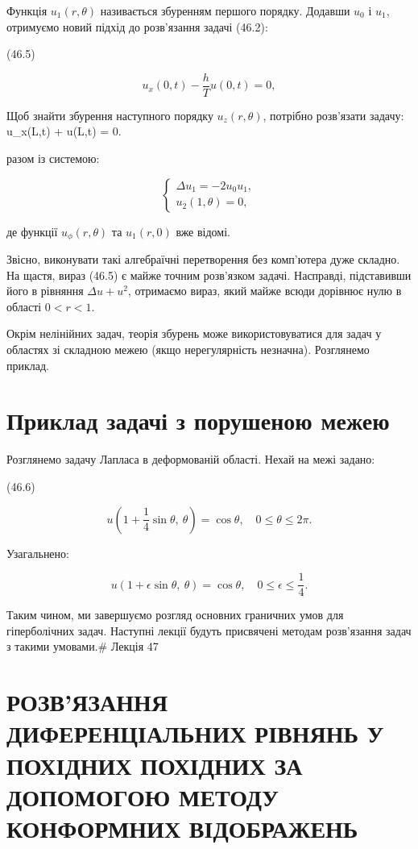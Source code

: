 \documentclass[
  ukrainian,
]{article}
\begin{document}
Функція \(u_1(r,\theta)\) називається збуренням першого порядку. Додавши
\(u_0\) і \(u_1\), отримуємо новий підхід до розв'язання задачі (46.2):

(46.5)

\[
u_x(0,t) - \frac{h}{T}u(0,t) = 0,
\]

Щоб знайти збурення наступного порядку \(u_z(r,\theta)\), потрібно
розв'язати задачу: u\_x(L,t) + u(L,t) = 0.

разом із системою:

\[
\begin{cases}
\Delta u_{1} = -2u_{0}u_{1}, \\
u_{2}(1,\theta) = 0,
\end{cases}
\]

де функції \(u_{\phi}(r,\theta)\) та \(u_{1}(r,0)\) вже відомі.

Звісно, виконувати такі алгебраїчні перетворення без комп'ютера дуже
складно. На щастя, вираз (46.5) є майже точним розв'язком задачі.
Насправді, підставивши його в рівняння \(\Delta u + u^{2}\), отримаємо
вираз, який майже всюди дорівнює нулю в області \(0 < r < 1\).

Окрім нелінійних задач, теорія збурень може використовуватися для задач
у областях зі складною межею (якщо нерегулярність незначна). Розглянемо
приклад.

\section{Приклад задачі з порушеною
межею}\label{ux43fux440ux438ux43aux43bux430ux434-ux437ux430ux434ux430ux447ux456-ux437-ux43fux43eux440ux443ux448ux435ux43dux43eux44e-ux43cux435ux436ux435ux44e}

Розглянемо задачу Лапласа в деформованій області. Нехай на межі задано:

(46.6)

\[
u\left(1 + \frac{1}{4} \sin \theta,\ \theta\right) = \cos \theta,\quad 0 \le \theta \le 2\pi.
\]

Узагальнено:

\[
u(1+\epsilon\sin\theta,\ \theta) = \cos\theta,\quad 0 \le \epsilon \le \frac{1}{4}.
\]

Таким чином, ми завершуємо розгляд основних граничних умов для
гіперболічних задач. Наступні лекції будуть присвячені методам
розв'язання задач з такими умовами.\# Лекція 47

\section{РОЗВ'ЯЗАННЯ ДИФЕРЕНЦІАЛЬНИХ РІВНЯНЬ У ПОХІДНИХ ПОХІДНИХ ЗА
ДОПОМОГОЮ МЕТОДУ КОНФОРМНИХ
ВІДОБРАЖЕНЬ}\label{ux440ux43eux437ux432ux44fux437ux430ux43dux43dux44f-ux434ux438ux444ux435ux440ux435ux43dux446ux456ux430ux43bux44cux43dux438ux445-ux440ux456ux432ux43dux44fux43dux44c-ux443-ux43fux43eux445ux456ux434ux43dux438ux445-ux43fux43eux445ux456ux434ux43dux438ux445-ux437ux430-ux434ux43eux43fux43eux43cux43eux433ux43eux44e-ux43cux435ux442ux43eux434ux443-ux43aux43eux43dux444ux43eux440ux43cux43dux438ux445-ux432ux456ux434ux43eux431ux440ux430ux436ux435ux43dux44c}
\end{document}
